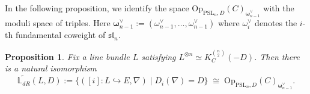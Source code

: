\documentclass[twoside, 11pt]{article}
\numberwithin{equation}{section}
\theoremstyle{theorem}
\numberwithin{theorem}{section}
\newtheorem{proposition}[proposition]{Proposition}
\theoremstyle{definition}
\begin{document}
In the following proposition, we identify the space
\(
\mathrm{Op}_{\mathrm{PSL}_n,D}(C)_{\boldsymbol{\omega}_{n-1}^{\vee}}
\)
with the moduli space of triples.
Here
\(
\boldsymbol{\omega}_{n-1}^{\vee}:=(\omega_{n-1}^\vee,\dots,\omega_{n-1}^\vee)
\)
where $\omega_i^{\vee}$ denotes the $i$-th fundamental coweight of $\mathfrak{sl}_n$.

\begin{proposition}\label{identify oper}
Fix a line bundle $L$ satisfying $L^{\otimes n}\simeq K_C^{\binom{n}{2}}(-D)$. Then there is a natural isomorphism
\begin{equation}\label{e: identify oper}
\widetilde{\mathbb{L}_{dR}}(L,D):=\bigl\{([i]\colon L\hookrightarrow E,\nabla)\mid D_i(\nabla)=D \bigr\} 
\;\cong\;
\mathrm{Op}_{\mathrm{PSL}_n,D}(C)_{\boldsymbol{\omega}_{n-1}^{\vee}}
.
\end{equation}
\end{proposition}
\end{document}
